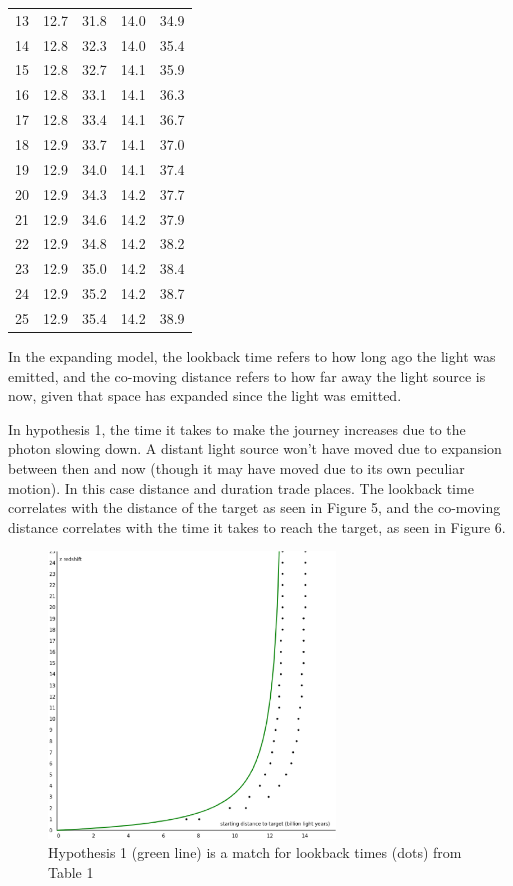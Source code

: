 \documentclass{ws-mpla}
\begin{document}
\begin{table}[p]
{\begin{tabular}{c@{\qquad}cc@{\qquad}cc}
    13    &   12.7   &    31.8   &   14.0   &    34.9 \\ 
    14    &   12.8   &    32.3   &   14.0   &    35.4 \\ 
    15    &   12.8   &    32.7   &   14.1   &    35.9 \\ 
    16    &   12.8   &    33.1   &   14.1   &    36.3 \\ 
    17    &   12.8   &    33.4   &   14.1   &    36.7 \\ 
    18    &   12.9   &    33.7   &   14.1   &    37.0 \\ 
    19    &   12.9   &    34.0   &   14.1   &    37.4 \\ 
    20    &   12.9   &    34.3   &   14.2   &    37.7 \\ 
    21    &   12.9   &    34.6   &   14.2   &    37.9 \\ 
    22    &   12.9   &    34.8   &   14.2   &    38.2 \\ 
    23    &   12.9   &    35.0   &   14.2   &    38.4 \\ 
    24    &   12.9   &    35.2   &   14.2   &    38.7 \\ 
    25    &   12.9   &    35.4   &   14.2   &    38.9 \\  
  \bottomrule
\end{tabular}\label{ta1} }
\end{table}

In the expanding model, the lookback time refers to how long ago the light was emitted, 
and the co-moving distance refers to how far away the light source is now, given that space has expanded since the light was emitted. 

In hypothesis 1, the time it takes to make the journey increases due to the photon slowing down. 
A distant light source won't have moved due to expansion between then and now (though it may have moved due to its own peculiar motion). 
In this case distance and duration trade places. The lookback time correlates with the distance of the target as seen in Figure 5, 
and the co-moving distance correlates with the time it takes to reach the target, as seen in Figure 6.  

\begin{figure}[hb]
\centerline{\includegraphics[width=3.0in]{graph_white_test2_2.eps}}
\vspace*{8pt}
\caption{Hypothesis 1 (green line) is a match for lookback times (dots) from Table 1}
\end{figure}
\end{document}
